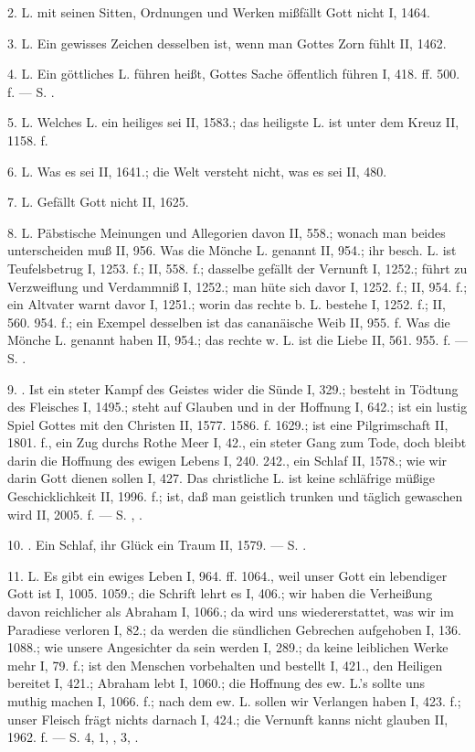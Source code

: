 2.  L. mit seinen Sitten, Ordnungen und Werken mißfällt Gott nicht I, 1464.

3.  L. Ein gewisses Zeichen desselben ist, wenn man Gottes Zorn fühlt II, 1462.

4.  L. Ein göttliches L. führen heißt, Gottes Sache öffentlich führen I, 418. ff. 500. f. — S. .

5.  L. Welches L. ein heiliges sei II, 1583.; das heiligste L. ist unter dem Kreuz II, 1158. f.

6.  L. Was es sei II, 1641.; die Welt versteht nicht, was es sei II, 480.

7.  L. Gefällt Gott nicht II, 1625.

8.  L. Päbstische Meinungen und Allegorien davon II, 558.; wonach man beides unterscheiden muß II, 956. Was die Mönche  L. genannt II, 954.; ihr besch. L. ist Teufelsbetrug I, 1253. f.; II, 558. f.; dasselbe gefällt der Vernunft I, 1252.; führt zu Verzweiflung und Verdammniß I, 1252.; man hüte sich davor I, 1252. f.; II, 954. f.; ein Altvater warnt davor I, 1251.; worin das rechte b. L. bestehe I, 1252. f.; II, 560. 954. f.; ein Exempel desselben ist das cananäische Weib II, 955. f. Was die Mönche  L. genannt haben II, 954.; das rechte w. L. ist die Liebe II, 561. 955. f. — S. .

9. . Ist ein steter Kampf des Geistes wider die Sünde I, 329.; besteht in Tödtung des Fleisches I, 1495.; steht auf Glauben und in der Hoffnung I, 642.; ist ein lustig Spiel Gottes mit den Christen II, 1577. 1586. f. 1629.; ist eine Pilgrimschaft II, 1801. f., ein Zug durchs Rothe Meer I, 42., ein steter Gang zum Tode, doch bleibt darin die Hoffnung des ewigen Lebens I, 240. 242., ein Schlaf II, 1578.; wie wir darin Gott dienen sollen I, 427. Das christliche L. ist keine schläfrige müßige Geschicklichkeit II, 1996. f.; ist, daß man geistlich trunken und täglich gewaschen wird II, 2005. f. — S. , .

10. . Ein Schlaf, ihr Glück ein Traum II, 1579. — S. .

11.  L. Es gibt ein ewiges Leben I, 964. ff. 1064., weil unser Gott ein lebendiger Gott ist I, 1005. 1059.; die Schrift lehrt es I, 406.; wir haben die Verheißung davon reichlicher als Abraham I, 1066.; da wird uns wiedererstattet, was wir im Paradiese verloren I, 82.; da werden die sündlichen Gebrechen aufgehoben I, 136. 1088.; wie unsere Angesichter da sein werden I, 289.; da keine leiblichen Werke mehr I, 79. f.; ist den Menschen vorbehalten und bestellt I, 421., den Heiligen bereitet I, 421.; Abraham lebt I, 1060.; die Hoffnung des ew. L.’s sollte uns muthig machen I, 1066. f.; nach dem ew. L. sollen wir Verlangen haben I, 423. f.; unser Fleisch frägt nichts darnach I, 424.; die Vernunft kanns nicht glauben II, 1962. f. — S.  4,  1, ,  3, .

